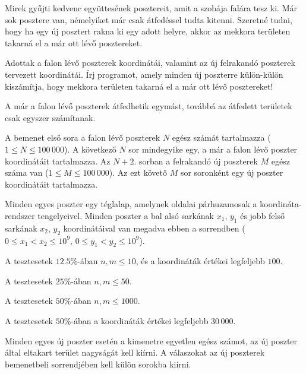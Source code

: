 

\usepackage{tikz}





Mirek gyűjti kedvenc együttesének posztereit, amit a szobája falára tesz ki. Már sok posztere van, némelyiket már csak átfedéssel tudta kitenni. Szeretné tudni, hogy ha egy új posztert rakna ki egy adott helyre, akkor az mekkora területen takarná el a már ott lévő posztereket. 

Adottak a falon lévő poszterek koordinátái, valamint az új felrakandó poszterek tervezett koordinátái. Írj programot, amely minden új poszterre külön-külön kiszámítja, hogy mekkora területen takarná el a már ott lévő posztereket!

A már a falon lévő poszterek átfedhetik egymást, továbbá az átfedett területek csak egyszer számítanak. 

A bemenet első sora a falon lévő poszterek $N$ egész számát tartalmazza ($1 \le N \le 100\,000$). A következő $N$ sor mindegyike egy, a már a falon lévő poszter koordinátáit tartalmazza. Az $N+2$. sorban a felrakandó új poszterek $M$ egész száma van ($1 \le M \le 100\,000$). Az ezt követő $M$ sor soronként egy új poszter koordinátáit tartalmazza.

Minden egyes poszter egy téglalap, amelynek oldalai párhuzamosak a koordináta-rendszer tengelyeivel. Minden poszter a bal alsó sarkának $x_1$, $y_1$ és jobb felső sarkának $x_2$, $y_2$ koordinátáival van megadva ebben a sorrendben ($0 \le x_1 < x_2 \le 10^9$, $0 \le y_1 < y_2 \le 10^9$).

A tesztesetek $12.5\%$-ában $n, m \le 10$, és a koordináták értékei legfeljebb $100$.

A tesztesetek $25\%$-ában $n, m \le 50$.

A tesztesetek $50\%$-ában $n, m \le 1000$.

A tesztesetek $50\%$-ában a koordináták értékei legfeljebb $30\,000$.

Minden egyes új poszter esetén a kimenetre egyetlen egész számot, az új poszter által eltakart terület nagyságát kell kiírni. A válaszokat az új poszterek bemenetbeli sorrendjében kell külön sorokba kiírni. 

